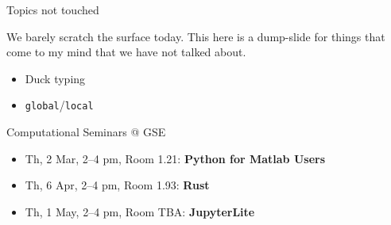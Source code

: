 \documentclass[usepdftitle=false, aspectratio=169]{beamer}
\newcommand{\code}[1]{\texttt{\color{mygreen}#1}}
\begin{document}
\begin{frame}
  {Topics not touched}

  We barely scratch the surface today. This here is a dump-slide for things
  that come to my mind that we have not talked about.

  \begin{itemize}
    \item Duck typing
    \item \code{global}/\code{local}
  \end{itemize}

\end{frame}



\begin{frame}
  {Computational Seminars @ GSE}

  \begin{itemize}\itemsep .5cm
    \item Th, 2 Mar, 2--4 pm, Room 1.21: \textbf{Python for Matlab Users}
    \item Th, 6 Apr, 2--4 pm, Room 1.93: \textbf{Rust}
    \item Th, 1 May, 2--4 pm, Room TBA: \textbf{JupyterLite} 
  \end{itemize}

\end{frame}
\end{document}
